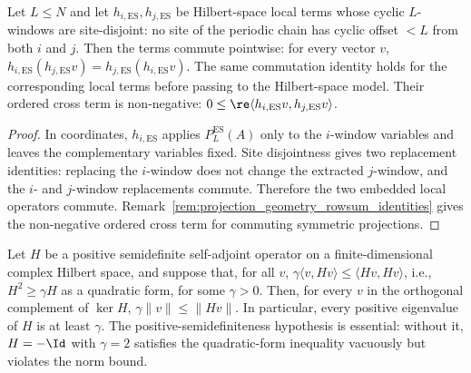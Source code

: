 \begin{lemma}
    \label{lem:transported_es_nonoverlap_positive}
    \leanok
    Let $L\le N$ and let $h_{i,\mathrm{ES}},h_{j,\mathrm{ES}}$ be
    Hilbert-space local terms whose cyclic $L$-windows are site-disjoint: no
    site of the periodic chain has cyclic offset $<L$ from both $i$ and $j$.
    Then the terms commute pointwise: for every vector $v$,
    $h_{i,\mathrm{ES}}(h_{j,\mathrm{ES}}v)
        =h_{j,\mathrm{ES}}(h_{i,\mathrm{ES}}v)$. The same commutation identity
    holds for the corresponding local terms before passing to the Hilbert-space
    model. Their ordered cross term is non-negative:
    $0\le\re\langle h_{i,\mathrm{ES}}v,h_{j,\mathrm{ES}}v\rangle$.
\end{lemma}

\begin{proof}
    \leanok
    In coordinates, $h_{i,\mathrm{ES}}$ applies $P_L^{\mathrm{ES}}(A)$ only to
    the $i$-window variables and leaves the complementary variables fixed. Site
    disjointness gives two replacement identities: replacing the $i$-window
    does not change the extracted $j$-window, and the $i$- and $j$-window
    replacements commute. Therefore the two embedded local operators commute.
    Remark~\ref{rem:projection_geometry_rowsum_identities} gives the
    non-negative ordered cross term for commuting symmetric projections.
\end{proof}

\begin{lemma}
    \label{lem:quadratic_form_to_norm_bound}
    \leanok
    Let $H$ be a positive semidefinite self-adjoint operator on a
    finite-dimensional complex Hilbert space, and suppose that, for all $v$,
    $\gamma\langle v,Hv\rangle \le\langle Hv,Hv\rangle$,
    i.e., $H^2\ge\gamma H$ as a quadratic form, for some $\gamma>0$.
    Then, for every $v$ in the orthogonal complement of $\ker H$,
    $\gamma\|v\|\le\|Hv\|$. In particular, every positive eigenvalue of $H$ is
    at least $\gamma$. The positive-semidefiniteness hypothesis is essential:
    without it, $H=-\Id$ with $\gamma=2$ satisfies the quadratic-form
    inequality vacuously but violates the norm bound.
\end{lemma}

